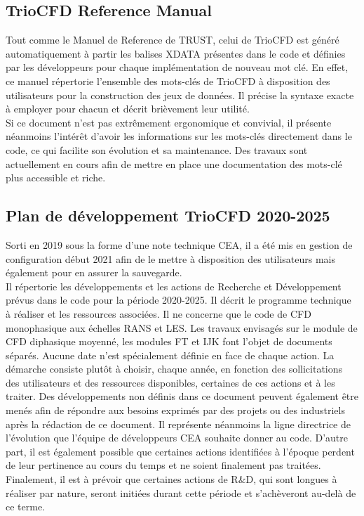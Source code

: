 \subsection{TrioCFD Reference Manual}
Tout comme le Manuel de Reference de TRUST, celui de TrioCFD est généré automatiquement à partir les balises XDATA présentes dans le code et définies par les développeurs pour chaque implémentation de nouveau mot clé. En effet, ce manuel répertorie l'ensemble des mots-clés de TrioCFD à disposition des utilisateurs pour la construction des jeux de données. Il précise la syntaxe exacte à employer pour chacun et décrit brièvement leur utilité.\\
Si ce document n'est pas extrêmement ergonomique et convivial, il présente néanmoins l'intérêt d'avoir les informations sur les mots-clés directement dans le code, ce qui facilite son évolution et sa maintenance. Des travaux sont actuellement en cours afin de mettre en place une documentation des mots-clé plus accessible et riche.

\subsection{Plan de d\'eveloppement TrioCFD 2020-2025}
Sorti en 2019 sous la forme d'une note technique CEA, il a été mis en gestion de configuration début 2021
afin de le mettre à disposition des utilisateurs mais également pour en assurer la sauvegarde.\\
Il répertorie les développements et les actions de Recherche et Développement prévus dans le code pour la période 2020-2025.
Il décrit le programme technique à réaliser et les ressources associées.
Il ne concerne que le code de CFD monophasique aux échelles RANS et LES.
Les travaux envisagés sur le module de CFD diphasique moyenné, les modules FT et IJK font l'objet de documents séparés.
Aucune date n'est spécialement définie en face de chaque action.
La démarche consiste plutôt à choisir, chaque année, en fonction des sollicitations
des utilisateurs et des ressources disponibles, certaines de ces actions et à les traiter.
Des développements non définis dans ce document peuvent également être menés afin de répondre
aux besoins exprimés par des projets ou des industriels après la rédaction de ce document.
Il représente néanmoins la ligne directrice de l'évolution que l'équipe de développeurs CEA souhaite donner au code.
D'autre part, il est également possible que certaines actions identifiées à l'époque perdent de leur pertinence
au cours du temps et ne soient finalement pas traitées.
Finalement, il est à prévoir que certaines actions de R\&D, qui sont longues à réaliser par nature,
seront initiées durant cette période et s'achèveront au-delà de ce terme.

